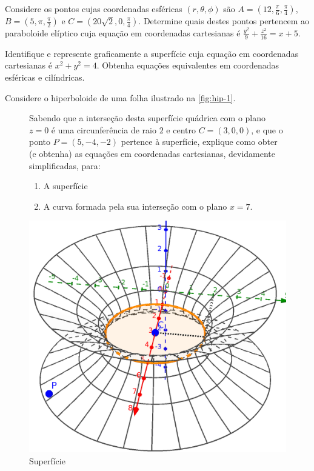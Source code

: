 \documentclass[12pt,a4paper]{article}
\newcommand{\fixme}{{\color{red}(...)}}
\begin{document}
\begin{ExerciseList}
\Exercise[title={2,5}] Considere os pontos cujas coordenadas esféricas $\left(r,\theta,\phi \right)$ são $A= \left(12, \frac{\pi}{6}, \frac{\pi}{4}\right)$, $B=(5,\pi,\frac{\pi}{2})$ e $C=(20\sqrt{2},0,\frac{\pi}{4})$. Determine quais destes pontos pertencem ao paraboloide elíptico cuja equação em coordenadas cartesianas é $\frac{y^2}{9} + \frac{z^2}{16} = x+5$.
\Answer \fixme

\Exercise[title={2,5}] Identifique e represente graficamente a superfície cuja equação em coordenadas cartesianas é $x^2 + y^2 = 4$. Obtenha equações equivalentes em coordenadas esféricas e cilíndricas.
\Answer \fixme


\Exercise[title={2,5}] Considere o hiperboloide de uma folha ilustrado na \autoref{fig:hip-1}.
\begin{figure}[h]
    \centering
    \begin{minipage}{0.65\textwidth}
    	Sabendo que a interseção desta superfície quádrica com o plano $z=0$ é uma circunferência de raio $2$ e centro $C=(3,0,0)$, e que o ponto $P=(5,-4,-2)$ pertence à superfície, explique como obter (e obtenha) as equações em coordenadas cartesianas, devidamente simplificadas, para:
		\begin{enumerate}
		\item A superfície
		\item A curva formada pela sua interseção com o plano $x=7$.
		\end{enumerate}
    \end{minipage}\hfill
    \begin{minipage}{0.30\textwidth}
        \centering
        \includegraphics[height=0.90\textwidth]{img/prova-4-pro-hiperboloide-1-folha.png}
        \caption{Superfície}\label{fig:hip-1}
    \end{minipage}
\end{figure}




\end{ExerciseList}
\end{document}
